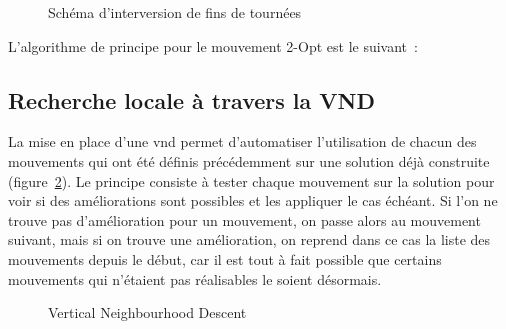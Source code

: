 			\begin{figure}[h!]
			\centering
			\begin{tikzpicture}[schema]
				
			\end{tikzpicture}
			\caption{Schéma d'interversion de fins de tournées}
			\label{fig:move_2opt}
			\end{figure}

			\newpage
			L'algorithme de principe pour le mouvement 2-Opt est le suivant :
			\begin{code}
				\begin{algo}[informal]
					\BEGIN
									\ENDFORGEN
								\ENDFORGEN
							\ENDFORGEN
						\ENDFORGEN
					\END
				\end{algo}
			\end{code}


		\subsection{Recherche locale à travers la VND}

			La mise en place d'une \acrlong{vnd} permet d'automatiser l'utilisation de chacun des mouvements qui ont été définis précédemment sur une solution déjà construite (figure~\ref{uml:vnd}). Le principe consiste à tester chaque mouvement sur la solution pour voir si des améliorations sont possibles et les appliquer le cas échéant. Si l'on ne trouve pas d'amélioration pour un mouvement, on passe alors au mouvement suivant, mais si on trouve une amélioration, on reprend dans ce cas la liste des mouvements depuis le début, car il est tout à fait possible que certains mouvements qui n'étaient pas réalisables le soient désormais. 
			
			\begin{figure}[h!]
				\centering
				\begin{tikzpicture}
					
				\end{tikzpicture}
				\caption[UML -- VND]{Vertical Neighbourhood Descent}
				\label{uml:vnd}
			\end{figure}

